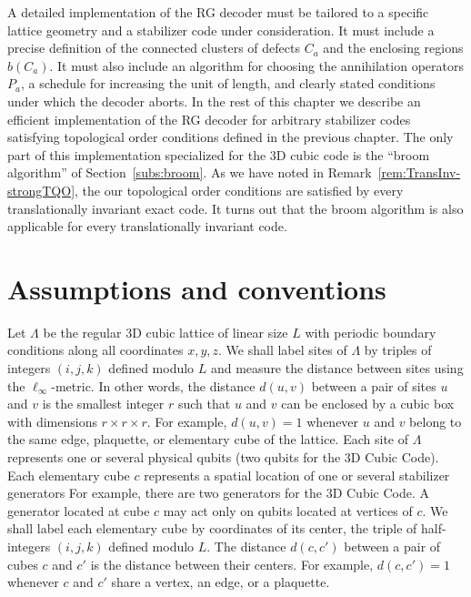A detailed  implementation of the RG decoder must  be tailored to a specific lattice geometry
and  a stabilizer code under consideration.
It must include a precise definition of  the connected clusters of defects $C_a$
and the enclosing regions $b(C_a)$. It must also include an algorithm for choosing the annihilation
operators $P_a$, a schedule for increasing the unit of length,
and clearly stated conditions under which the decoder aborts.
In the rest of this chapter we describe an efficient implementation of the RG decoder
for arbitrary stabilizer codes satisfying topological order conditions defined in the previous chapter.
The only part of this implementation specialized for the 3D cubic code 
is the ``broom algorithm'' of Section~\ref{subs:broom}.
As we have noted in Remark~\ref{rem:TransInv-strongTQO},
the our topological order conditions are satisfied by every translationally invariant exact code.
It turns out that the broom algorithm is also applicable for every translationally invariant code.


\section{Assumptions and conventions}
\label{sec:rg-decoder-assumptions}

Let $\Lambda$ be the regular 3D cubic lattice of linear size $L$ with periodic boundary conditions
along all coordinates $x,y,z$.
We shall label sites of $\Lambda$ by triples of integers $(i,j,k)$ defined modulo $L$
and measure the distance between sites using the $\ell_\infty$-metric. In other words,
the distance $d(u,v)$ between a pair of sites $u$ and $v$ is the smallest
integer $r$ such that $u$ and $v$ can be enclosed by a cubic box with dimensions
$r\times r\times r$. For example, $d(u,v)=1$ whenever $u$ and $v$ belong to the same
edge, plaquette, or elementary cube of the lattice.
Each site of $\Lambda$ represents one or several physical qubits (two qubits for the 3D Cubic Code).
Each elementary cube $c$ represents a spatial location of one or several  stabilizer generators
For example, there are two generators for the 3D Cubic Code.
A generator located at cube $c$ may act only on
qubits located at vertices of $c$. We shall label each elementary cube by
coordinates of its center, the triple of half-integers $(i,j,k)$ defined modulo $L$.
The distance $d(c,c')$ between a pair of cubes $c$ and $c'$ is the
distance between their centers.
For example, $d(c,c')=1$ whenever $c$ and $c'$ share a vertex, an edge, or a plaquette.

